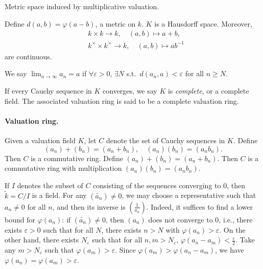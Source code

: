 \documentclass[11pt, a4paper]{report}
\begin{document}
\begin{definition}
Metric space induced by multiplicative valuation.

Define $d(a, b)=\varphi(a-b)$, a metric on $k$. $K$ is a Hausdorff space. Moreover,
\[
\begin{aligned}
& k \times k \rightarrow k,\quad (a, b) \mapsto a+b, \\
& k^{\times} \times k^{\times} \rightarrow k,\quad (a, b) \mapsto ab^{-1}
\end{aligned}
\]
are continuous.

We say $\lim_{n \rightarrow \infty} a_{n}=a$ if $\forall \varepsilon>0$, $\exists N$ s.t.\ $d\left(a_{n}, a\right)<\varepsilon$ for all $n \geqslant N$.

If every Cauchy sequence in $K$ converges, we say $K$ is \emph{complete}, or a complete field. The associated valuation ring is said to be a complete valuation ring.
\end{definition}

\paragraph{Valuation ring.}
Given a valuation field $K$, let $C$ denote the set of Cauchy sequences in $K$. Define
\[
\left(a_{n}\right)+\left(b_{n}\right)=\left(a_{n}+b_{n}\right), \quad \left(a_{n}\right)\left(b_{n}\right)=\left(a_{n}b_{n}\right).
\]
Then $C$ is a commutative ring.
Define $\left(a_{n}\right)+\left(b_{n}\right)=\left(a_{n}+b_{n}\right)$. Then $C$ is a commutative ring with multiplication $\left(a_{n}\right)\left(b_{n}\right)=\left(a_{n} b_{n}\right)$.

If $I$ denotes the subset of $C$ consisting of the sequences converging to $0$, then $\widetilde{k}=C/I$ is a field. For any $\left(\widetilde{a_{n}}\right) \neq 0$, we may choose a representative such that $a_{n} \neq 0$ for all $n$, and then its inverse is $\left(\frac{1}{a_{n}}\right)$. Indeed, it suffices to find a lower bound for $\varphi\left(a_{n}\right)$: if $\left(\widetilde{a_{n}}\right) \neq 0$, then $\left(a_{n}\right)$ does not converge to $0$, i.e., there exists $\varepsilon>0$ such that for all $N$, there exists $n>N$ with $\varphi\left(a_{n}\right)>\varepsilon$. On the other hand, there exists $N_{\varepsilon}$ such that for all $n, m>N_{\varepsilon}$, $\varphi\left(a_{n}-a_{m}\right)<\frac{\varepsilon}{2}$. Take any $m>N_{\varepsilon}$ such that $\varphi\left(a_{m}\right)>\varepsilon$. Since $\varphi\left(a_{m}\right)>\varphi\left(a_{n}-a_{m}\right)$, we have $\varphi\left(a_{n}\right)=\varphi\left(a_{m}\right)>\varepsilon$.
\end{document}
